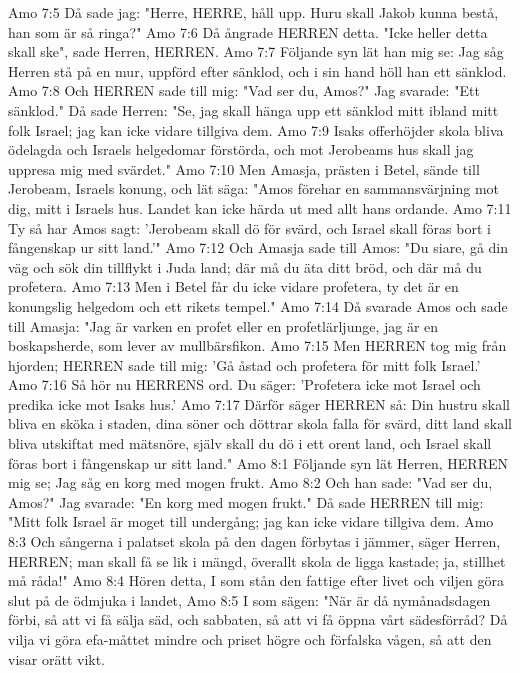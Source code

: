 Amo 7:5  Då sade jag: "Herre, HERRE, håll upp. Huru skall Jakob kunna bestå, han som är så ringa?"
Amo 7:6  Då ångrade HERREN detta. "Icke heller detta skall ske", sade Herren, HERREN.
Amo 7:7  Följande syn lät han mig se: Jag såg Herren stå på en mur, uppförd efter sänklod, och i sin hand höll han ett sänklod.
Amo 7:8  Och HERREN sade till mig: "Vad ser du, Amos?" Jag svarade: "Ett sänklod." Då sade Herren: "Se, jag skall hänga upp ett sänklod mitt ibland mitt folk Israel; jag kan icke vidare tillgiva dem.
Amo 7:9  Isaks offerhöjder skola bliva ödelagda och Israels helgedomar förstörda, och mot Jerobeams hus skall jag uppresa mig med svärdet."
Amo 7:10  Men Amasja, prästen i Betel, sände till Jerobeam, Israels konung, och lät säga: "Amos förehar en sammansvärjning mot dig, mitt i Israels hus. Landet kan icke härda ut med allt hans ordande.
Amo 7:11  Ty så har Amos sagt: 'Jerobeam skall dö för svärd, och Israel skall föras bort i fångenskap ur sitt land.'"
Amo 7:12  Och Amasja sade till Amos: "Du siare, gå din väg och sök din tillflykt i Juda land; där må du äta ditt bröd, och där må du profetera.
Amo 7:13  Men i Betel får du icke vidare profetera, ty det är en konungslig helgedom och ett rikets tempel."
Amo 7:14  Då svarade Amos och sade till Amasja: "Jag är varken en profet eller en profetlärljunge, jag är en boskapsherde, som lever av mullbärsfikon.
Amo 7:15  Men HERREN tog mig från hjorden; HERREN sade till mig: 'Gå åstad och profetera för mitt folk Israel.'
Amo 7:16  Så hör nu HERRENS ord. Du säger: 'Profetera icke mot Israel och predika icke mot Isaks hus.'
Amo 7:17  Därför säger HERREN så: Din hustru skall bliva en sköka i staden, dina söner och döttrar skola falla för svärd, ditt land skall bliva utskiftat med mätsnöre, själv skall du dö i ett orent land, och Israel skall föras bort i fångenskap ur sitt land."
Amo 8:1  Följande syn lät Herren, HERREN mig se; Jag såg en korg med mogen frukt.
Amo 8:2  Och han sade: "Vad ser du, Amos?" Jag svarade: "En korg med mogen frukt." Då sade HERREN till mig: "Mitt folk Israel är moget till undergång; jag kan icke vidare tillgiva dem.
Amo 8:3  Och sångerna i palatset skola på den dagen förbytas i jämmer, säger Herren, HERREN; man skall få se lik i mängd, överallt skola de ligga kastade; ja, stillhet må råda!"
Amo 8:4  Hören detta, I som stån den fattige efter livet och viljen göra slut på de ödmjuka i landet,
Amo 8:5  I som sägen: "När är då nymånadsdagen förbi, så att vi få sälja säd, och sabbaten, så att vi få öppna vårt sädesförråd? Då vilja vi göra efa-måttet mindre och priset högre och förfalska vågen, så att den visar orätt vikt.
